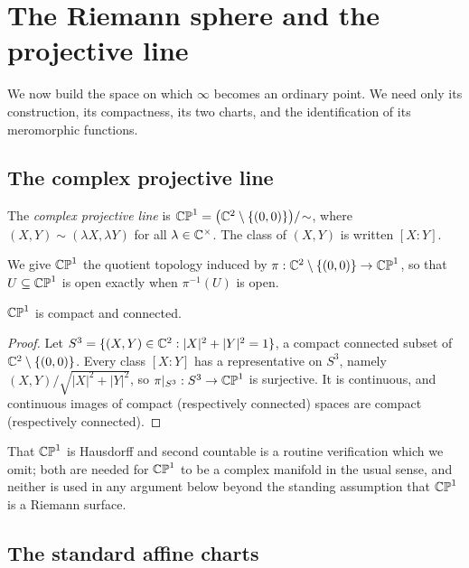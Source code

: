 \section{The Riemann sphere and the projective line}\label{sec:sphere}

We now build the space on which $\infty$ becomes an ordinary point. We need only
its construction, its compactness, its two charts, and the identification of its
meromorphic functions.

\subsection{The complex projective line}

\begin{definition}
The \emph{complex projective line} is
$\mathbb{CP}^1 = \big(\mathbb{C}^2 \setminus \{(0,0)\}\big) / \!\sim$, where
$(X,Y) \sim (\lambda X, \lambda Y)$ for all $\lambda \in \mathbb{C}^\times$. The class
of $(X,Y)$ is written $[X : Y]$.
\end{definition}

We give $\mathbb{CP}^1$ the quotient topology induced by
$\pi : \mathbb{C}^2 \setminus\{(0,0)\} \to \mathbb{CP}^1$, so that $U \subseteq \mathbb{CP}^1$ is open
exactly when $\pi^{-1}(U)$ is open.

\begin{smjproposition}\label{prop:compact}
$\mathbb{CP}^1$ is compact and connected.
\end{smjproposition}

\begin{proof}
Let $S^3 = \{(X,Y) \in \mathbb{C}^2 : |X|^2 + |Y|^2 = 1\}$, a compact connected subset
of $\mathbb{C}^2 \setminus \{(0,0)\}$. Every class $[X:Y]$ has a representative on
$S^3$, namely $(X,Y)/\sqrt{|X|^2+|Y|^2}$, so $\pi|_{S^3} : S^3 \to \mathbb{CP}^1$ is
surjective. It is continuous, and continuous images of compact (respectively
connected) spaces are compact (respectively connected).
\end{proof}

\begin{remark}
That $\mathbb{CP}^1$ is Hausdorff and second countable is a routine verification which we
omit; both are needed for $\mathbb{CP}^1$ to be a complex manifold in the usual sense, and
neither is used in any argument below beyond the standing assumption that $\mathbb{CP}^1$
is a Riemann surface.
\end{remark}

\subsection{The standard affine charts}

